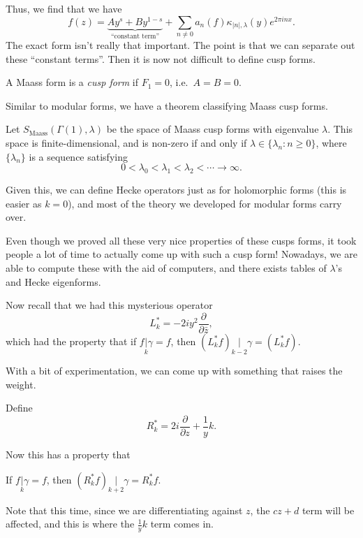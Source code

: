 \documentclass[a4paper]{article}
\begin{document}
Thus, we find that we have
\[
  f(z) = \underbrace{A y^s + B y^{1 - s}}_{\text{``constant term''}} + \sum_{n \not= 0} a_n (f) \kappa_{|n|, \lambda}(y) e^{2\pi i n x}.
\]
The exact form isn't really that important. The point is that we can separate out these ``constant terms''. Then it is now not difficult to define cusp forms.

\begin{defi}
  A Maass form is a \emph{cusp form} if $F_1 = 0$, i.e.\ $A = B = 0$.
\end{defi}

Similar to modular forms, we have a theorem classifying Maass cusp forms.

\begin{thm}[Maass]
  Let $S_{\mathrm{Maass}}(\Gamma(1), \lambda)$ be the space of Maass cusp forms with eigenvalue $\lambda$. This space is finite-dimensional, and is non-zero if and only if $\lambda \in \{\lambda_n : n \geq 0\}$, where $\{\lambda_n\}$ is a sequence satisfying
  \[
    0 < \lambda_0 < \lambda_1 < \lambda_2 < \cdots \to \infty.
  \]
\end{thm}
Given this, we can define Hecke operators just as for holomorphic forms (this is easier as $k = 0$), and most of the theory we developed for modular forms carry over.

Even though we proved all these very nice properties of these cusps forms, it took people a lot of time to actually come up with such a cusp form! Nowadays, we are able to compute these with the aid of computers, and there exists tables of $\lambda$'s and Hecke eigenforms.

Now recall that we had this mysterious operator
\[
  L_k^* = -2i y^2 \frac{\partial}{\partial \bar{z}},
\]
which had the property that if $f \underset{k}{|} \gamma = f$, then $(L_k^* f)\underset{k - 2}{|} \gamma = (L_k^* f)$.

With a bit of experimentation, we can come up with something that raises the weight.
\begin{defi}[$R_k^*$]
  Define
  \[
    R_k^* = 2i \frac{\partial}{\partial z} + \frac{1}{y}k.
  \]
\end{defi}

Now this has a property that
\begin{prop}
  If $f\underset{k}{|} \gamma = f$, then $(R_k^* f)\underset{k + 2}{|} \gamma = R_k^* f$.
\end{prop}
Note that this time, since we are differentiating against $z$, the $cz + d$ term will be affected, and this is where the $\frac{1}{y}k$ term comes in.
\end{document}
